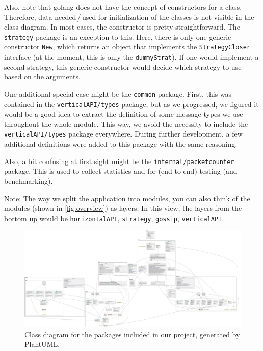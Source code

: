 \documentclass[a4paper,english,10pt,NET]{tumarticle}
\begin{document}
Also, note that golang does not have the concept of constructors for a class.
Therefore, data needed\,/\,used for initialization of the classes is not visible in the class diagram.
In most cases, the constructor is pretty straightforward.
The \texttt{strategy} package is an exception to this.
Here, there is only one generic constructor \texttt{New}, which returns an object that implements the \texttt{StrategyCloser} interface (at the moment, this is only the \texttt{dummyStrat}).
If one would implement a second strategy, this generic constructor would decide which strategy to use based on the arguments.

One additional special case might be the \texttt{common} package.
First, this was contained in the \texttt{verticalAPI/types} package, but as we progressed, we figured it would be a good idea to extract the definition of some message types we use throughout the whole module.
This way, we avoid the necessity to include the \texttt{verticalAPI/types} package everywhere.
During further development, a few additional definitions were added to this package with the same reasoning.

Also, a bit confusing at first sight might be the \texttt{internal/packetcounter} package.
This is used to collect statistics and for (end-to-end) testing (and benchmarking).

Note: The way we split the application into modules, you can also think of the modules (shown in \cref{fig:overview}) as layers.
In this view, the layers from the bottom up would be \texttt{horizontalAPI}, \texttt{strategy}, \texttt{gossip}, \texttt{verticalAPI}.

\begin{landscape}
	\pagestyle{empty}
	\begin{figure}
		\centering
		\hspace*{-0.1\linewidth}\includegraphics[width=1.2\linewidth]{figures/class}
		\caption{Class diagram for the packages included in our project, generated by PlantUML.}
		\label{fig:classDia}
	\end{figure}
\end{landscape}
\end{document}
